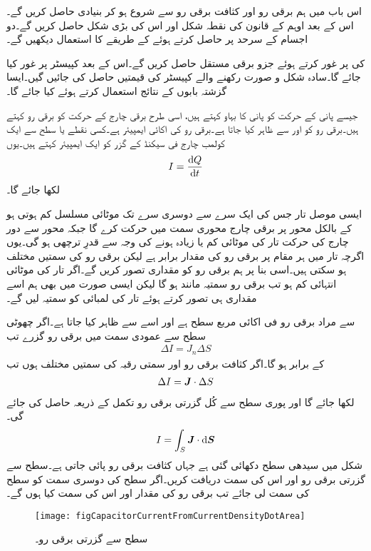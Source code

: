 اس باب میں ہم برقی رو اور کثافت برقی رو سے شروع ہو کر بنیادی   حاصل کریں گے۔اس کے بعد  اوہم کے قانون کی نقطہ شکل  اور اس کی بڑی شکل حاصل کریں گے۔دو اجسام کے سرحد پر  حاصل کرتے ہوئے  کے طریقے کا استعمال دیکھیں گے۔

  کی  پر غور کرتے ہوئے  جزو برقی مستقل حاصل کریں گے۔اس کے بعد کپیسٹر پر غور کیا جائے گا۔سادہ شکل و صورت رکھنے والے  کپیسٹر کی قیمتیں حاصل کی جائیں گیں۔ایسا گزشتہ بابوں کے نتائج استعمال کرتے ہوئے کیا جائے گا۔ 

جیسے پانی کے حرکت کو پانی کا بہاو کہتے ہیں،  اسی طرح برقی چارج کے حرکت کو برقی رو کہتے ہیں۔برقی رو کو  اور  سے ظاہر کیا جاتا ہے۔برقی رو کی اکائی ایمپیئر  ہے۔کسی نقطے یا سطح سے ایک کولمب چارج فی سیکنڈ کے گزر کو ایک ایمپیئر کہتے ہیں۔یوں
\begin{align}
I=\frac{\dif Q}{\dif t}
\end{align}
لکھا جائے گا۔

ایسی موصل تار جس کی ایک سرے سے دوسری سرے تک موٹائی مسلسل کم ہوتی ہو کے بالکل محور پر برقی چارج محوری سمت میں حرکت کرے گا جبکہ محور سے دور چارج کی حرکت تار کی موٹائی کم یا زیادہ ہونے کی وجہ سے قدرِ ترچھی ہو گی۔یوں اگرچہ تار میں ہر مقام پر برقی رو کی مقدار برابر ہے لیکن برقی رو کی سمتیں مختلف ہو سکتی ہیں۔اسی بنا پر ہم برقی رو کو مقداری تصور کریں گے۔اگر تار کی موٹائی انتہائی کم ہو تب برقی رو سمتیہ مانند ہو گا لیکن ایسی صورت میں بھی ہم اسے مقداری ہی تصور کرتے ہوئے تار کی لمبائی کو سمتیہ لیں گے۔

 سے مراد برقی رو فی اکائی مربع سطح  ہے اور اسے  سے ظاہر کیا جاتا ہے۔اگر چھوٹی سطح  سے عمودی سمت میں  برقی رو گزرے تب
\begin{align}
\Delta I=J_n \Delta S
\end{align}
کے برابر ہو گا۔اگر کثافت برقی رو اور سمتی رقبہ کی سمتیں مختلف ہوں تب
\begin{align}
\Delta I = {{\boldsymbol{J}}} \cdot \Delta S
\end{align}
لکھا جائے گا اور پوری سطح سے کُل گزرتی برقی رو تکمل کے ذریعہ حاصل کی جائے گی۔
\begin{align} \label{مساوات_کپیسٹر_برقی_رو_کثافت_کا_سطحی_تکمل_ہے}
I=\int_S \kvec{J} \cdot \dif \kvec{S}
\end{align}
%
شکل  میں سیدھی سطح  دکھائی گئی ہے جہاں کثافت برقی رو  پائی جاتی ہے۔سطح سے گزرتی برقی رو اور اس کی سمت دریافت کریں۔اگر سطح کی دوسری سمت کو سطح کی سمت لی جائے تب برقی رو کی مقدار اور اس کی سمت کیا ہوں گے۔
\begin{figure}
\centering
\texttt{[image: figCapacitorCurrentFromCurrentDensityDotArea]}
\caption{سطح سے گزرتی برقی رو۔}
\label{شکل_کپیسٹر_سطح_سے_گزرتی_برقی_رو}
\end{figure}

